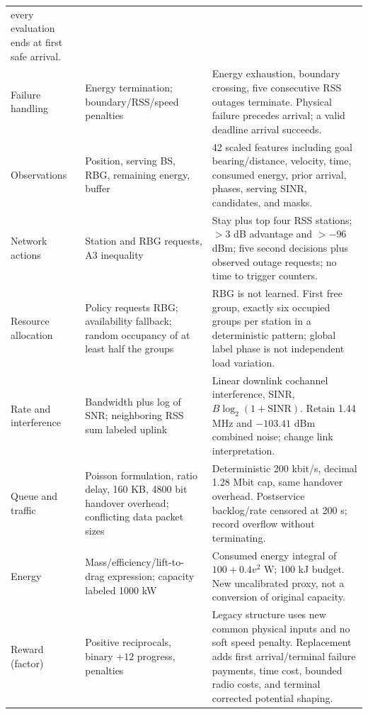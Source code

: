 {\begin{tabular}{@{}p{}p{}p{}@{}}
every evaluation ends at first safe arrival. \\
Failure handling & Energy termination; boundary/RSS/speed penalties
\cite[p.~12, Sec.~5.2, Eq.~(14)]{thesis}
& Energy exhaustion, boundary crossing, five consecutive RSS outages terminate.
Physical failure precedes arrival; a valid deadline arrival succeeds. \\
Observations & Position, serving BS, RBG, remaining energy, buffer
\cite[p.~12, Sec.~5.2]{thesis}
& 42 scaled features including goal bearing/distance, velocity, time,
consumed energy, prior arrival, phases, serving SINR, candidates, and masks. \\
Network actions & Station and RBG requests, A3 inequality
\cite[p.~9, Eq.~(3); p.~12, Sec.~5.2]{thesis}
& Stay plus top four RSS stations; $>3$ dB advantage and $>-96$ dBm;
five second decisions plus observed outage requests; no time to trigger counters. \\
Resource allocation & Policy requests RBG; availability fallback; random
occupancy of at least half the groups~\cite[pp.~9, 12, 14--15]{thesis}
& RBG is not learned. First free group, exactly six occupied groups per station
in a deterministic pattern; global label phase is not independent load variation. \\
Rate and interference & Bandwidth plus log of SNR; neighboring RSS sum labeled
uplink~\cite[p.~10, Eqs.~(7)--(9)]{thesis}
& Linear downlink cochannel interference, SINR, $B\log_2(1+\mathrm{SINR})$.
Retain 1.44 MHz and $-103.41$ dBm combined noise; change link interpretation. \\
Queue and traffic & Poisson formulation, ratio delay, 160 KB, 4800 bit handover
overhead; conflicting data packet sizes~\cite[pp.~9--10, Eqs.~(4)--(6); pp.~14--15]{thesis}
& Deterministic 200 kbit/s, decimal 1.28 Mbit cap, same handover overhead.
Postservice backlog/rate censored at 200 s; record overflow without terminating. \\
Energy & Mass/efficiency/lift-to-drag expression; capacity labeled 1000 kW
\cite[p.~10, Eq.~(10); p.~15, Table~3]{thesis}
& Consumed energy integral of $100+0.4v^2$ W; 100 kJ budget. New uncalibrated
proxy, not a conversion of original capacity. \\
Reward (factor) & Positive reciprocals, binary $+12$ progress, penalties
\cite[p.~12, Eqs.~(13)--(14); p.~15, Table~3]{thesis}
& Legacy structure uses new common physical inputs and no soft speed penalty.
Replacement adds first arrival/terminal failure payments, time cost, bounded
radio costs, and terminal corrected potential shaping. \\

\end{tabular}}
